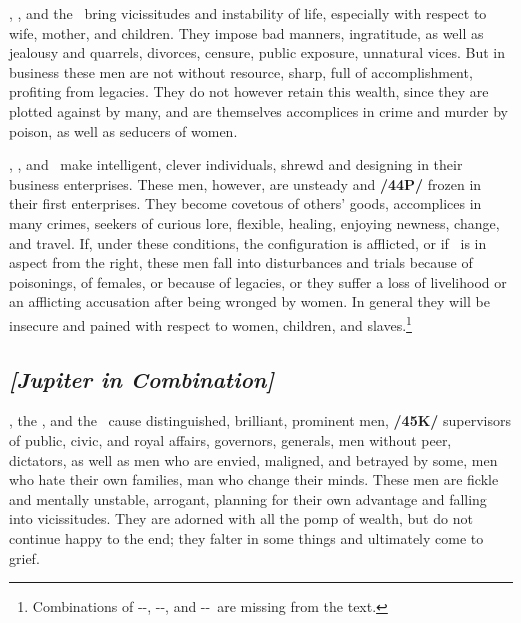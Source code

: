 \Saturn, \Venus, and the \Moon\, bring vicissitudes and instability of life, especially with respect to wife, mother, and children. They impose bad manners, ingratitude, as well as jealousy and quarrels, divorces, censure, public exposure, unnatural vices. But in business these men are not without resource, sharp, full of accomplishment, profiting from legacies. They do not however retain this wealth, since they are plotted against by many, and are themselves accomplices in crime and murder by poison, as well as seducers of women.

\Saturn, \Venus, and \Mercury\, make intelligent, clever individuals, shrewd and designing in their business enterprises. These men, however, are unsteady and \textbf{/44P/} frozen in their first enterprises. They become covetous of others’ goods, accomplices in many crimes, seekers of curious lore, flexible, healing, enjoying newness, change, and travel. If, under these conditions, the configuration is afflicted, or if \Mars\, is in aspect from the right, these men fall into disturbances and trials because of poisonings, of females, or because of legacies, or they suffer a loss of livelihood or an afflicting accusation after being wronged by women. In general they will be insecure and pained with respect to women, children, and slaves.\footnote{Combinations of \Saturn-\Mercury-\Sun, \Saturn-\Mercury-\Moon, and \Saturn-\Sun-\Moon\, are missing from the text.}

\secbr
{}
\subsection{\textit{[Jupiter in Combination]}}
\Jupiter, the \Sun, and the \Moon\, cause distinguished, brilliant, prominent men, \textbf{/45K/} supervisors of
public, civic, and royal affairs, governors, generals, men without peer, dictators, as well as men who are envied, maligned, and betrayed by some, men who hate their own families, man who change their minds. These men are fickle and mentally unstable, arrogant, planning for their own advantage and falling into vicissitudes. They are adorned with all the pomp of wealth, but do not continue happy to the end; they
falter in some things and ultimately come to grief.


